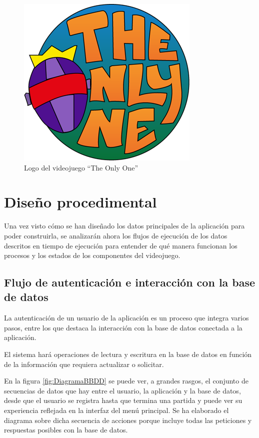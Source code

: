 \begin{figure}[h]
    \centering
    \includegraphics[scale=0.45]{img/Logo_TheOnlyOne.png}
    \caption{Logo del videojuego ``The Only One''}
    \label{fig:Logo}
    \end{figure}

\section{Diseño procedimental}
Una vez visto cómo se han diseñado los datos principales de la aplicación para poder construirla, se analizarán ahora los flujos de ejecución de los datos descritos en tiempo de ejecución para entender de qué manera funcionan los procesos y los estados de los componentes del videojuego.

\subsection{Flujo de autenticación e interacción con la base de datos}
La autenticación de un usuario de la aplicación es un proceso que integra varios pasos, entre los que destaca la interacción con la base de datos conectada a la aplicación.

El sistema hará operaciones de lectura y escritura en la base de datos en función de la información que requiera actualizar o solicitar.

En la figura \ref{fig:DiagramaBBDD} se puede ver, a grandes rasgos, el conjunto de secuencias de datos que hay entre el usuario, la aplicación y la base de datos, desde que el usuario se registra hasta que termina una partida y puede ver su experiencia reflejada en la interfaz del menú principal. Se ha elaborado el diagrama sobre dicha secuencia de acciones porque incluye todas las peticiones y respuestas posibles con la base de datos.

